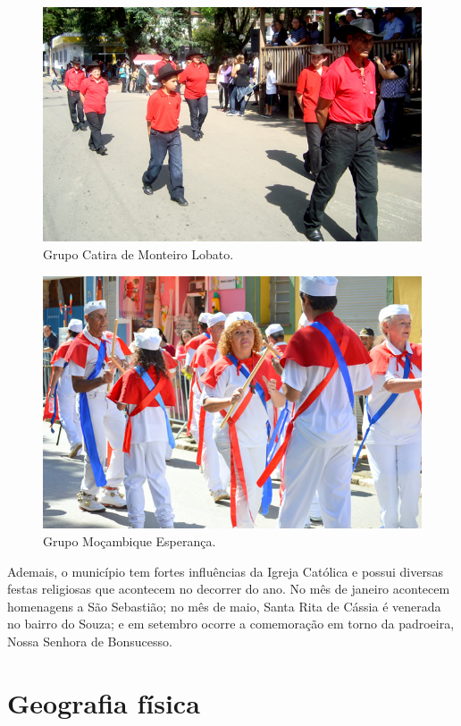  \begin{figure}[h!]
	\centering
	\includegraphics[width=0.85\linewidth]{produtos/proddois/image015}
	\caption{Grupo Catira de Monteiro Lobato.}
	\label{fig:image015}
\end{figure}

 \begin{figure}[h!]
	\centering
	\includegraphics[width=0.85\linewidth]{produtos/proddois/image016}
	\caption{Grupo Moçambique Esperança.}
	\label{fig:image016}
\end{figure}

Ademais, o município tem fortes influências da Igreja Católica e possui diversas festas religiosas que acontecem no decorrer do ano. No mês de janeiro acontecem homenagens a São Sebastião; no mês de maio, Santa Rita de Cássia é venerada no bairro do Souza; e em setembro ocorre a comemoração em torno da padroeira, Nossa Senhora de Bonsucesso.
\clearpage

\section{Geografia física}

